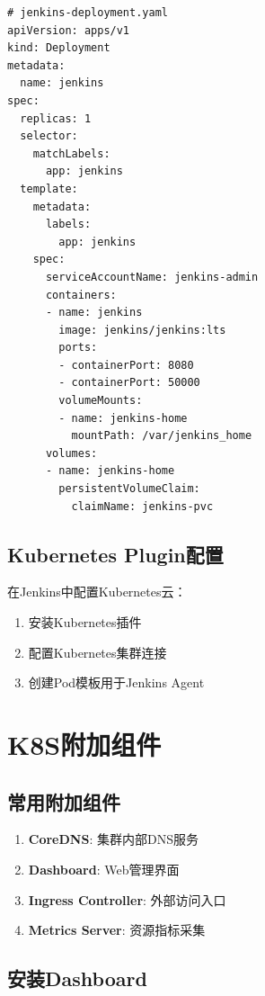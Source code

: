 \documentclass[12pt,UTF8]{ctexbook}
\begin{document}
\begin{lstlisting}
# jenkins-deployment.yaml
apiVersion: apps/v1
kind: Deployment
metadata:
  name: jenkins
spec:
  replicas: 1
  selector:
    matchLabels:
      app: jenkins
  template:
    metadata:
      labels:
        app: jenkins
    spec:
      serviceAccountName: jenkins-admin
      containers:
      - name: jenkins
        image: jenkins/jenkins:lts
        ports:
        - containerPort: 8080
        - containerPort: 50000
        volumeMounts:
        - name: jenkins-home
          mountPath: /var/jenkins_home
      volumes:
      - name: jenkins-home
        persistentVolumeClaim:
          claimName: jenkins-pvc
\end{lstlisting}

\subsection{Kubernetes Plugin配置}

在Jenkins中配置Kubernetes云：
\begin{enumerate}
    \item 安装Kubernetes插件
    \item 配置Kubernetes集群连接
    \item 创建Pod模板用于Jenkins Agent
\end{enumerate}

\section{K8S附加组件}
\label{sec:k8s-addons}

\subsection{常用附加组件}

\begin{enumerate}
    \item \textbf{CoreDNS}: 集群内部DNS服务
    \item \textbf{Dashboard}: Web管理界面
    \item \textbf{Ingress Controller}: 外部访问入口
    \item \textbf{Metrics Server}: 资源指标采集
\end{enumerate}

\subsection{安装Dashboard}
\end{document}
